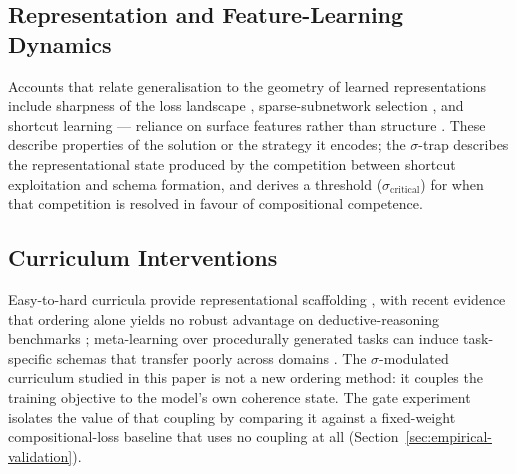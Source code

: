 \documentclass{article}
\theoremstyle{definition}
\begin{document}
\subsection{Representation and Feature-Learning Dynamics}\label{sec:repr-dynamics}

Accounts that relate generalisation to the geometry of learned
representations include sharpness of the loss landscape
\citep{foret2021sharpnessawareminimization}, sparse-subnetwork
selection \citep{frankle2019lotteryticket}, and shortcut learning ---
reliance on surface features rather than structure
\citep{geirhos2020shortcutlearning}. These describe properties of the
solution or the strategy it encodes; the $\sigma$-trap describes the
representational state produced by the competition between shortcut
exploitation and schema formation, and derives a threshold
($\sigma_{\text{critical}}$) for when that competition is resolved in
favour of compositional competence.

\subsection{Curriculum Interventions}\label{sec:curriculum}

Easy-to-hard curricula provide representational scaffolding
\citep{bengio2009curriculumlearning,kumar2010selfpacedlearning,
portelas2020automaticcurriculumlearningdeep,narvekar2020curriculumlearningreinforcementlearning},
with recent evidence that ordering alone yields no robust advantage on
deductive-reasoning benchmarks \citep{mordig2026rethinkingeasytohard};
meta-learning over procedurally generated tasks can induce task-specific
schemas that transfer poorly across domains
\citep{mondorf2026compositionalarc}. The $\sigma$-modulated curriculum
studied in this paper is not a new ordering method: it couples the
training objective to the model's own coherence state. The gate
experiment isolates the value of that coupling by comparing it against
a fixed-weight compositional-loss baseline that uses no coupling at all
(Section~\ref{sec:empirical-validation}).
\end{document}

